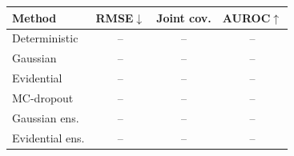 \begin{tabular}{lccc}
\toprule
Method & RMSE$\downarrow$ & Joint cov. & AUROC$\uparrow$ \\
\midrule
Deterministic & -- & -- & -- \\
Gaussian & -- & -- & -- \\
Evidential & -- & -- & -- \\
MC-dropout & -- & -- & -- \\
Gaussian ens. & -- & -- & -- \\
Evidential ens. & -- & -- & -- \\
\bottomrule
\end{tabular}
